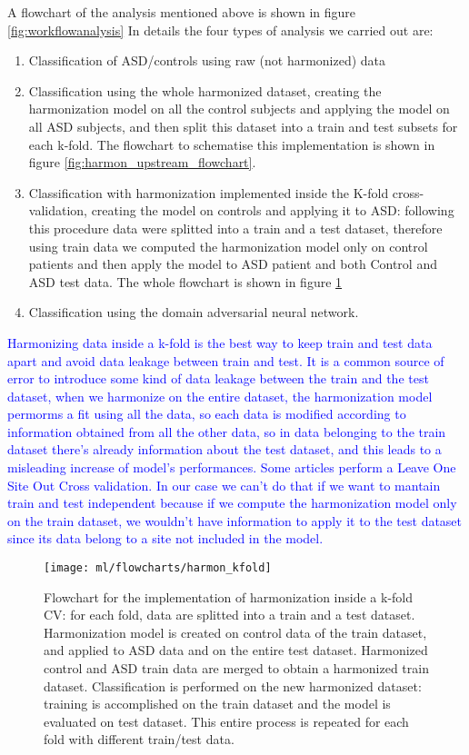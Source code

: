 \documentclass[11pt]{report}
\begin{document}
A flowchart of the analysis mentioned above is shown in figure \ref{fig:workflowanalysis}
In details the four types of analysis we carried out are:
\begin{enumerate}
\item Classification of ASD/controls using raw (not harmonized) data
\item Classification using the whole harmonized dataset, creating the harmonization model on all the control subjects and applying the model on all ASD subjects, and then split this dataset into a train and test subsets for each k-fold. The flowchart to schematise this implementation is shown in figure \ref{fig:harmon_upstream_flowchart}.
\item Classification with harmonization implemented inside the K-fold cross-validation, creating the model on controls and applying it to ASD: following this procedure data were splitted into a train and a test dataset, therefore using train data we computed the harmonization model only on control patients and then apply the model to ASD patient and both Control and ASD test data.
The whole flowchart is shown in figure \ref{fig:harmon_kfold_flowchart}
\item Classification using the domain adversarial neural network.
\end{enumerate}

\textcolor{blue}{
Harmonizing data inside a k-fold is the best way to keep train and test data apart and avoid data leakage between train and test.
It is a common source of error to introduce some kind of data leakage between the train and the test dataset, when we harmonize on the entire dataset, the harmonization model permorms a fit using all the data, so each data is modified according to information obtained from all the other data, so in data belonging to the train dataset there's already information about the test dataset, and this leads to a misleading increase of model's performances.
Some articles perform a Leave One Site Out Cross validation. In our case we can't do that if we want to mantain train and test independent because if we compute the harmonization model only on the train dataset, we wouldn't have information to apply it to the test dataset since its data belong to a site not included in the model.
}


\begin{figure}[h!]
\centering
\texttt{[image: ml/flowcharts/harmon\_kfold]}
\caption{Flowchart for the implementation of harmonization inside a k-fold CV: for each fold, data are splitted into a train and a test dataset. Harmonization model is created on control data of the train dataset, and applied to ASD data and on the entire test dataset. Harmonized control and ASD train data are merged to obtain a harmonized train dataset. Classification is performed on the new harmonized dataset: training is accomplished on the train dataset and the model is evaluated on test dataset. This entire process is repeated for each fold with different train/test data.}
\label{fig:harmon_kfold_flowchart}
\end{figure}
\end{document}

